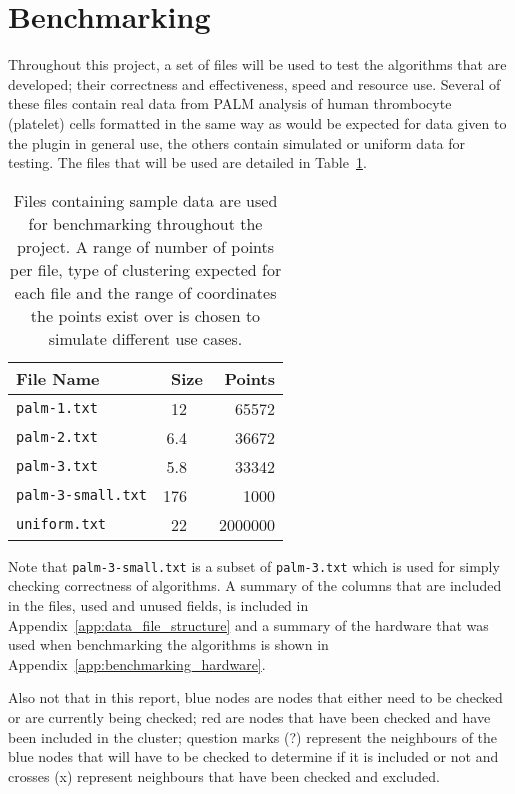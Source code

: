 
\section{Benchmarking}
\label{sec:benchmarking}

Throughout this project, a set of files will be used to test the algorithms
that are developed; their correctness and effectiveness, speed and resource
use.  Several of these files contain real data from PALM analysis of human
thrombocyte (platelet) cells formatted in the same way as would be expected for
data given to the plugin in general use, the others contain simulated or
uniform data for testing. The files that will be used are detailed in
Table~\ref{tab:benchmarking-files}.

\renewcommand{\arraystretch}{1.3}
\begin{table}[htbp]
\centering
\begin{tabular} {l r r}
	\toprule
	File Name & Size & Points \\
	\midrule
	\texttt{palm-1.txt} & \SI{12}{\mebi\byte} & 65572 \\
	\texttt{palm-2.txt} & \SI{6.4}{\mebi\byte} & 36672 \\
	\texttt{palm-3.txt} & \SI{5.8}{\mebi\byte} & 33342 \\
	\texttt{palm-3-small.txt} & \SI{176}{\kibi\byte} & 1000 \\
	\texttt{uniform.txt} & \SI{22}{\mebi\byte} & 2000000 \\
	\bottomrule
\end{tabular}

\caption[Sample data files used for testing and benchmarking.]{Files containing
	sample data are used for benchmarking throughout the project. A range of
	number of points per file, type of clustering expected for each file and
	the range of coordinates the points exist over is chosen to simulate
	different use cases.}\label{tab:benchmarking-files}
\end{table}

Note that \texttt{palm-3-small.txt} is a subset of \texttt{palm-3.txt} which
is used for simply checking correctness of algorithms. A summary of the
columns that are included in the files, used and unused fields, is included in
Appendix~\ref{app:data_file_structure} and a summary of the hardware that was
used when benchmarking the algorithms is shown in
Appendix~\ref{app:benchmarking_hardware}.

Also not that in this report, blue nodes are nodes that either need to be
checked or are currently being checked; red are nodes that have been checked
and have been included in the cluster; question marks ({\footnotesize?})
represent the neighbours of the blue nodes that will have to be checked to
determine if it is included or not and crosses ({\footnotesize x}) represent
neighbours that have been checked and excluded.
